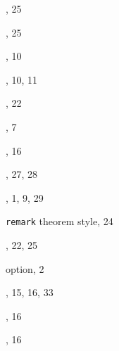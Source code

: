 \documentclass[leqno,titlepage,openany]{amsldoc}
\begin{document}
\begin{theindex}
  \indexspace

  \item {}, 25
  \item {}, 25
  \item {}, 10
  \item {}, 10, 11

  \indexspace

  \item {}, 22
  \item {}, 7
  \item {}, 16
  \item {}, 27, 28
  \item {}, 1, 9, 29
  \item \texttt{remark} theorem style, 24
  \item {}, 22, 25
  \item {} option, 2
  \item {}, 15, 16, 33
  \item {}, 16
  \item {}, 16

  \indexspace


\end{theindex}
\end{document}
